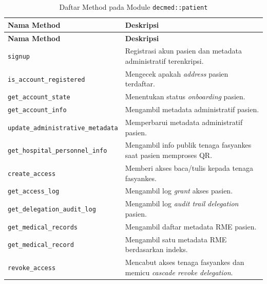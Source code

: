 \documentclass[bahasa, 12pt, a4paper, onecolumn, oneside, final]{report}
\begin{document}
\begin{longtable}{|Y{0.45\textwidth}|Y{0.47\textwidth}|}
	\caption{Daftar Method pada Module \texttt{decmed::patient}}
	\label{tab:daftar-method-decmed-patient}                                                                                   \\
	\hline
	\textbf{Nama Method}                      & \textbf{Deskripsi}                                                             \\
	\hline
	\endfirsthead
	\hline
	\textbf{Nama Method}                      & \textbf{Deskripsi}                                                             \\
	\hline
	\endhead

	\texttt{signup}                           & Registrasi akun pasien dan metadata administratif terenkripsi.                 \\ \hline
	\texttt{is\_account\_registered}          & Mengecek apakah \textit{address} pasien  terdaftar.                            \\ \hline
	\texttt{get\_account\_state}              & Menentukan status \textit{onboarding} pasien.                                  \\ \hline
	\texttt{get\_account\_info}               & Mengambil metadata administratif pasien.                                       \\ \hline
	\texttt{update\_administrative\_metadata} & Memperbarui metadata administratif pasien.                                     \\ \hline
	\texttt{get\_hospital\_personnel\_info}   & Mengambil info publik tenaga fasyankes saat pasien memproses QR.               \\ \hline
	\texttt{create\_access}                   & Memberi akses baca/tulis kepada tenaga fasyankes.                              \\ \hline
	\texttt{get\_access\_log}                 & Mengambil log \textit{grant} akses pasien.                                     \\ \hline
	\texttt{get\_delegation\_audit\_log}      & Mengambil log \textit{audit trail} \textit{delegation} pasien.                 \\ \hline
	\texttt{get\_medical\_records}            & Mengambil daftar metadata RME pasien.                                          \\ \hline
	\texttt{get\_medical\_record}             & Mengambil satu metadata RME berdasarkan indeks.                                \\ \hline
	\texttt{revoke\_access}                   & Mencabut akses tenaga fasyankes dan memicu \textit{cascade revoke delegation}. \\ \hline
\end{longtable}
\end{document}
